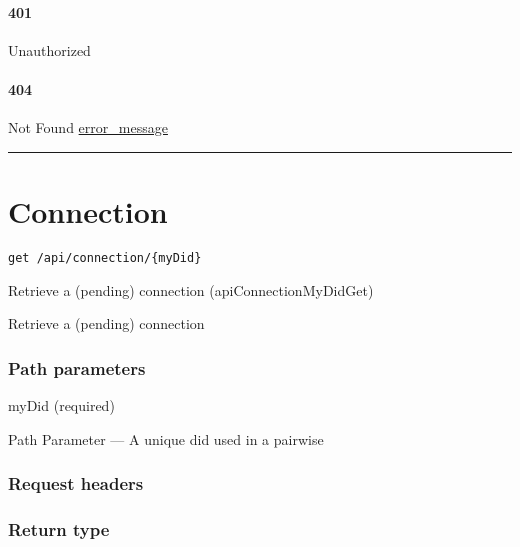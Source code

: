 \hypertarget{section-58}{%
\paragraph{401}\label{section-58}}

Unauthorized \protect\hyperlink{}{}

\hypertarget{section-59}{%
\paragraph{404}\label{section-59}}

Not Found \protect\hyperlink{error_message}{error\_message}

\begin{center}\rule{0.5\linewidth}{\linethickness}\end{center}

\hypertarget{connection-1}{%
\section{\texorpdfstring{\protect\hypertarget{Connection}{}{Connection}}{Connection}}\label{connection-1}}

\protect\hypertarget{apiConnectionMyDidGet}{}{}

\begin{verbatim}
get /api/connection/{myDid}
\end{verbatim}

Retrieve a (pending) connection ({apiConnectionMyDidGet})

Retrieve a (pending) connection

\hypertarget{path-parameters-11}{%
\subsubsection{Path parameters}\label{path-parameters-11}}

myDid (required)

{Path Parameter} --- A unique did used in a pairwise

\hypertarget{request-headers-5}{%
\subsubsection{Request headers}\label{request-headers-5}}

\hypertarget{return-type-14}{%
\subsubsection{Return type}\label{return-type-14}}


